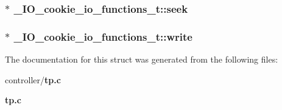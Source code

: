 \subsubsection[{seek}]{ $\ast$ {\bf \_\-IO\_\-cookie\_\-io\_\-functions\_\-t::seek}}\label{struct__IO__cookie__io__functions__t_a3a1d7e65f762f73024a06636375a71ef}
\subsubsection[{write}]{ $\ast$ {\bf \_\-IO\_\-cookie\_\-io\_\-functions\_\-t::write}}\label{struct__IO__cookie__io__functions__t_a55b08c19bcac6cbc9c61de1de18209c8}


The documentation for this struct was generated from the following files:\begin{DoxyCompactItemize}
\item 
controller/{\bf tp.c}\item 
{\bf tp.c}\end{DoxyCompactItemize}
